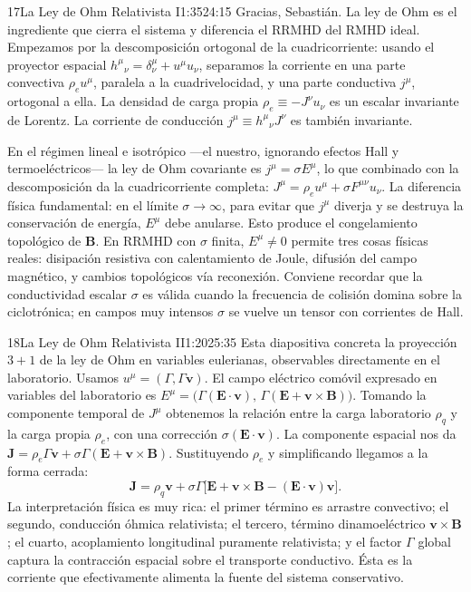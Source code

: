 \documentclass[11pt,a4paper]{article}
\begin{document}
\begin{bryorador}{17}{La Ley de Ohm Relativista I}{1:35}{24:15}
Gracias, Sebastián. La ley de Ohm es el ingrediente que cierra el sistema y
diferencia el RRMHD del RMHD ideal. Empezamos por la descomposición ortogonal
de la cuadricorriente: usando el proyector espacial
$h^\mu{}_\nu=\delta^\mu_\nu+u^\mu u_\nu$, separamos la corriente en una parte
convectiva $\rho_e u^\mu$, paralela a la cuadrivelocidad, y una parte
conductiva $j^\mu$, ortogonal a ella. La densidad de carga propia
$\rho_e\equiv -J^\nu u_\nu$ es un escalar invariante de Lorentz. La corriente
de conducción $j^\mu\equiv h^\mu{}_\nu J^\nu$ es también invariante.

En el régimen lineal e isotrópico ---el nuestro, ignorando efectos Hall y
termoeléctricos--- la ley de Ohm covariante es $j^\mu=\sigma E^\mu$, lo que
combinado con la descomposición da la cuadricorriente completa:
$J^\mu=\rho_e u^\mu+\sigma F^{\mu\nu}u_\nu$. La diferencia física fundamental:
en el límite $\sigma\to\infty$, para evitar que $j^\mu$ diverja y se destruya
la conservación de energía, $E^\mu$ debe anularse. Esto produce el
congelamiento topológico de $\mathbf{B}$. En RRMHD con $\sigma$ finita,
$E^\mu\neq 0$ permite tres cosas físicas reales: disipación resistiva con
calentamiento de Joule, difusión del campo magnético, y cambios topológicos
vía reconexión. Conviene recordar que la conductividad escalar $\sigma$ es
válida cuando la frecuencia de colisión domina sobre la ciclotrónica; en
campos muy intensos $\sigma$ se vuelve un tensor con corrientes de Hall.
\end{bryorador}

\begin{bryorador}{18}{La Ley de Ohm Relativista II}{1:20}{25:35}
Esta diapositiva concreta la proyección $3+1$ de la ley de Ohm en variables
eulerianas, observables directamente en el laboratorio. Usamos
$u^\mu=(\Gamma,\Gamma\mathbf{v})$. El campo eléctrico comóvil expresado en
variables del laboratorio es
$E^\mu=\bigl(\Gamma(\mathbf{E}\cdot\mathbf{v}),\,\Gamma(\mathbf{E}+
\mathbf{v}\times\mathbf{B})\bigr)$. Tomando la componente temporal de
$J^\mu$ obtenemos la relación entre la carga laboratorio $\rho_q$ y la carga
propia $\rho_e$, con una corrección $\sigma(\mathbf{E}\cdot\mathbf{v})$. La
componente espacial nos da
$\mathbf{J}=\rho_e\Gamma\mathbf{v}+\sigma\Gamma(\mathbf{E}+\mathbf{v}\times
\mathbf{B})$. Sustituyendo $\rho_e$ y simplificando llegamos a la forma
cerrada:
\[
\mathbf{J}=\rho_q\mathbf{v}+\sigma\Gamma\bigl[\mathbf{E}+\mathbf{v}\times
\mathbf{B}-(\mathbf{E}\cdot\mathbf{v})\mathbf{v}\bigr].
\]
La interpretación física es muy rica: el primer término es arrastre
convectivo; el segundo, conducción óhmica relativista; el tercero, término
dinamoeléctrico $\mathbf{v}\times\mathbf{B}$; el cuarto, acoplamiento
longitudinal puramente relativista; y el factor $\Gamma$ global captura la
contracción espacial sobre el transporte conductivo. Ésta es la corriente que
efectivamente alimenta la fuente del sistema conservativo.
\end{bryorador}
\end{document}
